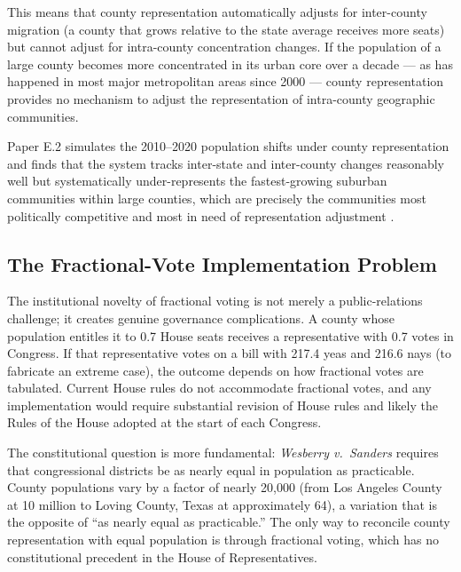 This means that county representation automatically adjusts for inter-county
migration (a county that grows relative to the state average receives more
seats) but cannot adjust for intra-county concentration changes.  If the
population of a large county becomes more concentrated in its urban core over
a decade --- as has happened in most major metropolitan areas since 2000 ---
county representation provides no mechanism to adjust the representation of
intra-county geographic communities.

Paper E.2 simulates the 2010--2020 population shifts under county representation
and finds that the system tracks inter-state and inter-county changes reasonably
well but systematically under-represents the fastest-growing suburban communities
within large counties, which are precisely the communities most politically
competitive and most in need of representation adjustment
\citep{dellaLibera2026e2}.

\subsection{The Fractional-Vote Implementation Problem}

The institutional novelty of fractional voting is not merely a public-relations
challenge; it creates genuine governance complications.  A county whose
population entitles it to 0.7 House seats receives a representative with 0.7
votes in Congress.  If that representative votes on a bill with 217.4 yeas
and 216.6 nays (to fabricate an extreme case), the outcome depends on how
fractional votes are tabulated.  Current House rules do not accommodate
fractional votes, and any implementation would require substantial revision
of House rules and likely the Rules of the House adopted at the start of
each Congress.

The constitutional question is more fundamental: \emph{Wesberry v.\ Sanders}
\citep{wesberry1964} requires that congressional districts be as nearly equal
in population as practicable.  County populations vary by a factor of nearly
20,000 (from Los Angeles County at 10 million to Loving County, Texas at
approximately 64), a variation that is the opposite of ``as nearly equal as
practicable.''  The only way to reconcile county representation with equal
population is through fractional voting, which has no constitutional precedent
in the House of Representatives.
